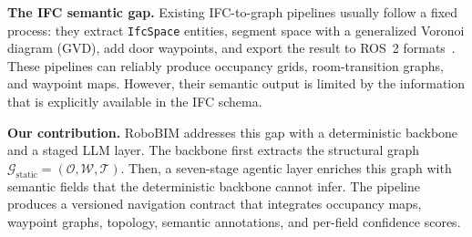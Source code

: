 \documentclass[a4paper, 10pt, conference]{ieeeconf}
\begin{document}
\textbf{The IFC semantic gap.} Existing IFC-to-graph pipelines usually follow a fixed process: they extract \texttt{IfcSpace} entities, segment space with a generalized Voronoi diagram (GVD), add door waypoints, and export the result to ROS~2 formats~\cite{teo2018igit, lin2020igssnn, zhu2024graph, ifcgraph2025, constructionrobotics2023}. These pipelines can reliably produce occupancy grids, room-transition graphs, and waypoint maps. However, their semantic output is limited by the information that is explicitly available in the IFC schema.


\textbf{Our contribution.} RoboBIM addresses this gap with a deterministic backbone and a staged LLM layer. The backbone first extracts the structural graph $\mathcal{G}_{\text{static}}=(\mathcal{O},\mathcal{W},\mathcal{T})$. Then, a seven-stage agentic layer enriches this graph with semantic fields that the deterministic backbone cannot infer. The pipeline produces a versioned navigation contract that integrates occupancy maps, waypoint graphs, topology, semantic annotations, and per-field confidence scores.

\end{document}
